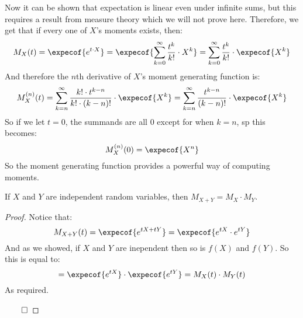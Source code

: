 Now it can be shown that expectation is linear even under infinite sums, but this requires a result from measure theory which we will
not prove here.
Therefore, we get that if every one of $X$'s moments exists, then:
\[ M_X(t) = \expecof{e^{t\cdot X}} = \expecof{\sum_{k=0}^\infty \frac{t^k}{k!}\cdot X^k} =
\sum_{k=0}^\infty \frac{t^k}{k!}\cdot \expecof{X^k} \]
And therefore the $n$th derivative of $X$'s moment generating function is:
\[ M_X^{(n)}(t) = \sum_{k=n}^\infty \frac{k!\cdot t^{k-n}}{k!\cdot(k-n)!}\cdot\expecof{X^k} =
\sum_{k=n}^\infty \frac{t^{k-n}}{(k-n)!}\cdot\expecof{X^k} \]
So if we let $t=0$, the summands are all $0$ except for when $k=n$, sp this becomes:
\[ M_X^{(n)}(0) = \expecof{X^n} \]
So the moment generating function provides a powerful way of computing moments.

\begin{prop*}

	If $X$ and $Y$ are independent random variables, then $M_{X+Y}=M_X\cdot M_Y$.

\end{prop*}

\begin{proof}

	Notice that:
	\[ M_{X+Y}(t) = \expecof{e^{tX+tY}} = \expecof{e^{tX}\cdot e^{tY}} \]
	And as we showed, if $X$ and $Y$ are inependent then so is $f(X)$ and $f(Y)$.
	So this is equal to:
	\[ = \expecof{e^{tX}}\cdot\expecof{e^{tY}} = M_X(t)\cdot M_Y(t) \]
	As required.

	\hfill$\qed$

\end{proof}

